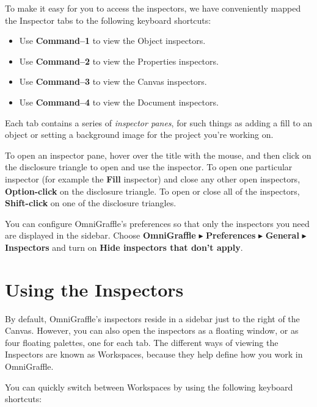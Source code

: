 \documentclass[../main.tex]{subfiles}
\begin{document}
To make it easy for you to access the inspectors, we have conveniently mapped the Inspector tabs
to the following keyboard shortcuts:

\begin{itemize}
  \item Use \textbf{Command--1} to view the Object inspectors.
  \item Use \textbf{Command--2} to view the Properties inspectors.
  \item Use \textbf{Command--3} to view the Canvas inspectors.
  \item Use \textbf{Command--4} to view the Document inspectors.
\end{itemize}

Each tab contains a series of \textit{inspector panes}, for such things as adding a fill to an
object or setting a background image for the project you're working on.

To open an inspector pane, hover over the title with the mouse, and then click on the disclosure
triangle to open and use the inspector. To open one particular inspector (for example the
\textbf{Fill} inspector) and close any other open inspectors, \textbf{Option-click} on the
disclosure triangle. To open or close all of the inspectors, \textbf{Shift-click} on one of
the disclosure triangles.


\begin{ogtip}
  You can configure OmniGraffle's preferences so that only the inspectors you need are displayed
  in the sidebar. Choose \textbf{OmniGraffle} $\blacktriangleright$ \textbf{Preferences}
  $\blacktriangleright$ \textbf{General} $\blacktriangleright$ \textbf{Inspectors} and turn on
  \textbf{Hide inspectors that don't apply}.
\end{ogtip}

\section{Using the Inspectors}

By default, OmniGraffle's inspectors reside in a sidebar just to the right of the Canvas.
However, you can also open the inspectors as a floating window, or as four floating palettes,
one for each tab. The different ways of viewing the Inspectors are known as Workspaces,
because they help define how you work in OmniGraffle.

You can quickly switch between Workspaces by using the following keyboard shortcuts:
\end{document}
